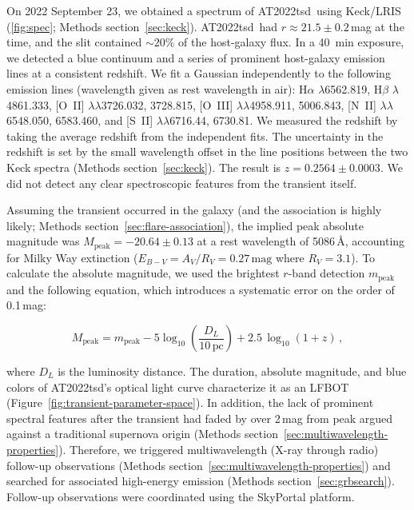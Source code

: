 \documentclass{nature_plusfigure}
\newcommand{\at}{AT2022tsd}
\begin{document}
\begin{methods}
On 2022 September 23, we obtained a spectrum of \at\ using Keck/LRIS (\ref{fig:spec}; Methods section~\ref{sec:keck}).
\at\ had $r\approx21.5\pm0.2$\,mag at the time, and the slit contained $\sim20\%$ of the host-galaxy flux.
In a 40~min exposure, we detected a blue continuum and a series of prominent host-galaxy emission lines at a consistent redshift. We fit a Gaussian independently to the following emission lines (wavelength given as rest wavelength in air): H$\alpha$ $\lambda$6562.819, H$\beta$ $\lambda$4861.333,  [O~II] $\lambda\lambda$3726.032, 3728.815,
 [O~III] $\lambda\lambda$4958.911, 5006.843, 
  [N~II] $\lambda\lambda$6548.050, 6583.460, and [S~II] $\lambda\lambda$6716.44, 6730.81. 
We measured the redshift by taking the average redshift from the independent fits. The uncertainty in the redshift is set by the small wavelength offset in the line positions between the two Keck spectra (Methods section~\ref{sec:keck}). The result is $z=0.2564\pm0.0003$.
We did not detect any clear spectroscopic features from the transient itself.

Assuming the transient occurred in the galaxy (and the association is highly likely; Methods section~\ref{sec:flare-association}), the implied peak absolute magnitude was $M_{\mathrm{peak}}=-20.64\pm0.13$ at a rest wavelength of 5086\,\AA, accounting for Milky Way extinction ($E_{B-V}=A_V/R_V=0.27\,\mathrm{mag}$ where $R_V=3.1$)\cite{Finkbeiner1999,Schlegel1998,Schlafly2011}. 
To calculate the absolute magnitude, we used the brightest $r$-band detection $m_\mathrm{peak}$ and the following equation, which introduces a systematic error on the order of 0.1\,mag\cite{Whitesides2017}:

\begin{equation}
M_\mathrm{peak} = m_\mathrm{peak} - 5 \log_{10} \left( \frac{D_L}{10\,\mathrm{pc}} \right) + 2.5\,\log_{10} (1+z) \, ,
\end{equation}

\noindent where $D_L$ is the luminosity distance. The duration, absolute magnitude, and blue colors of \at's optical light curve characterize it as an LFBOT (Figure~\ref{fig:transient-parameter-space}). In addition, the lack of prominent spectral features after the transient had faded by over 2\,mag from peak argued against a traditional supernova origin (Methods section~\ref{sec:multiwavelength-properties}). Therefore, we triggered multiwavelength (X-ray through radio) follow-up observations (Methods section~\ref{sec:multiwavelength-properties}) and searched for associated high-energy emission (Methods section~\ref{sec:grbsearch}). Follow-up observations were coordinated using the SkyPortal\cite{vanderWalt2019,Coughlin2023} platform.


\end{methods}
\end{document}
